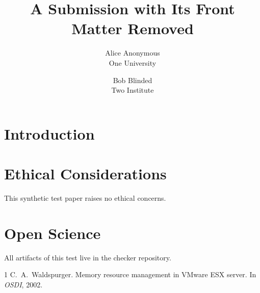 \documentclass[letterpaper,twocolumn,10pt]{article}
\date{}
\title{\Large \bf A Submission with Its Front Matter Removed}
\author{{\rm Alice Anonymous}\\One University \and {\rm Bob Blinded}\\Two Institute}
\begin{document}
\maketitle

\begin{abstract}
\lipsum[1][1-5]
\end{abstract}

\section{Introduction}
\lipsum[2-4]

\appendix
\section*{Ethical Considerations}
This synthetic test paper raises no ethical concerns.

\section*{Open Science}
All artifacts of this test live in the checker repository.

\begin{thebibliography}{1}
 C.~A.\ Waldspurger. Memory resource management in VMware ESX
  server. In \emph{OSDI}, 2002.
\end{thebibliography}
\end{document}

